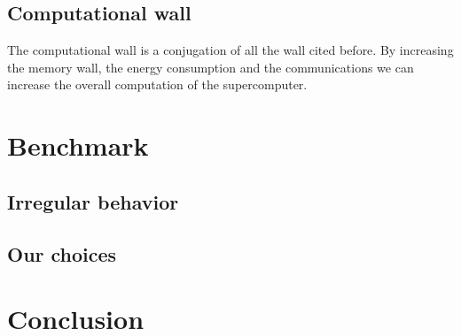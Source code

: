 \subsection{Computational wall}
The computational wall is a conjugation of all the wall cited before. 
By increasing the memory wall, the energy consumption and the communications we can increase the overall computation of the supercomputer. 

\section{Benchmark}

\subsection{Irregular behavior}

\subsection{Our choices}


\section{Conclusion}